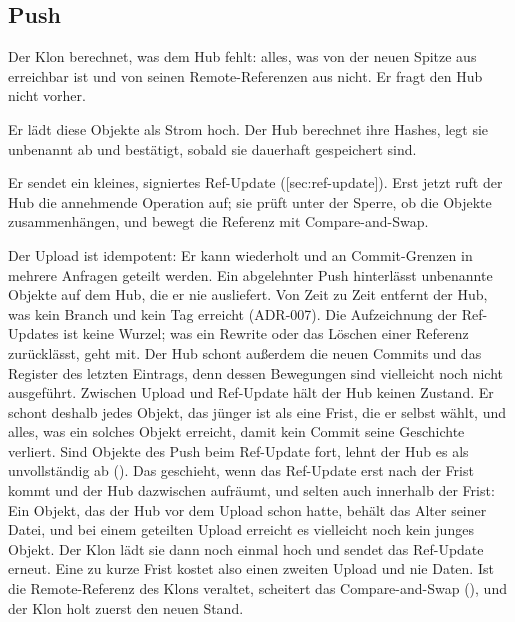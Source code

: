 \subsection{Push}

\startitemize[n]
\item Der Klon berechnet, was dem Hub fehlt: alles, was von der neuen Spitze aus erreichbar ist
und von seinen Remote-Referenzen aus nicht.
Er fragt den Hub nicht vorher.
\item Er lädt diese Objekte als Strom hoch.
Der Hub berechnet ihre Hashes, legt sie unbenannt ab und bestätigt, sobald sie dauerhaft
gespeichert sind.
\item Er sendet ein kleines, signiertes Ref-Update ([sec:ref-update]).
Erst jetzt ruft der Hub die annehmende Operation auf; sie prüft unter der Sperre, ob die Objekte
zusammenhängen, und bewegt die Referenz mit Compare-and-Swap.
\stopitemize

Der Upload ist idempotent: Er kann wiederholt und an Commit-Grenzen in mehrere Anfragen geteilt
werden.
Ein abgelehnter Push hinterlässt unbenannte Objekte auf dem Hub, die er nie ausliefert.
Von Zeit zu Zeit entfernt der Hub, was kein Branch und kein Tag erreicht (ADR-007).
Die Aufzeichnung der Ref-Updates ist keine Wurzel; was ein Rewrite oder das Löschen einer
Referenz zurücklässt, geht mit.
Der Hub schont außerdem die neuen Commits und das Register des letzten Eintrags, denn dessen
Bewegungen sind vielleicht noch nicht ausgeführt.
Zwischen Upload und Ref-Update hält der Hub keinen Zustand.
Er schont deshalb jedes Objekt, das jünger ist als eine Frist, die er selbst wählt,
und alles, was ein solches Objekt erreicht, damit kein Commit seine Geschichte verliert.
Sind Objekte des Push beim Ref-Update fort, lehnt der Hub es als unvollständig ab
().
Das geschieht, wenn das Ref-Update erst nach der Frist kommt und der Hub dazwischen aufräumt,
und selten auch innerhalb der Frist:
Ein Objekt, das der Hub vor dem Upload schon hatte, behält das Alter seiner Datei, und bei einem
geteilten Upload erreicht es vielleicht noch kein junges Objekt.
Der Klon lädt sie dann noch einmal hoch und sendet das Ref-Update erneut.
Eine zu kurze Frist kostet also einen zweiten Upload und nie Daten.
Ist die Remote-Referenz des Klons veraltet, scheitert das Compare-and-Swap (), und der
Klon holt zuerst den neuen Stand.

